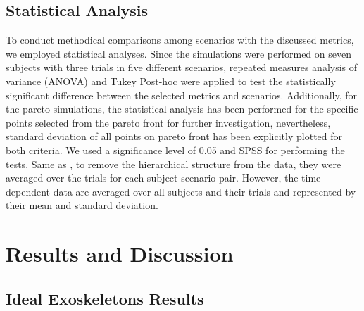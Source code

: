 \documentclass[10pt,letterpaper]{article}
\begin{document}
\subsection*{Statistical Analysis}
To conduct methodical comparisons among scenarios with the discussed metrics, we employed statistical analyses. Since the simulations were performed on seven subjects with three trials in five different scenarios, repeated measures analysis of variance (ANOVA) and Tukey Post-hoc were applied to test the statistically significant difference between the selected metrics and scenarios.  Additionally, for the pareto simulations, the statistical analysis has been performed for the specific points selected from the pareto front for further investigation, nevertheless, standard deviation of all points on pareto front has been explicitly plotted for both criteria. We used a significance level of 0.05 and SPSS \cite{spss} for performing the tests. Same as \cite{93}, to remove the hierarchical structure from the data, they were averaged over the trials for each subject-scenario pair. However, the time-dependent data are averaged over all subjects and their trials and represented by their mean and standard deviation.
\section*{\textbf{Results and Discussion}}
\subsection*{Ideal Exoskeletons Results}
\end{document}
